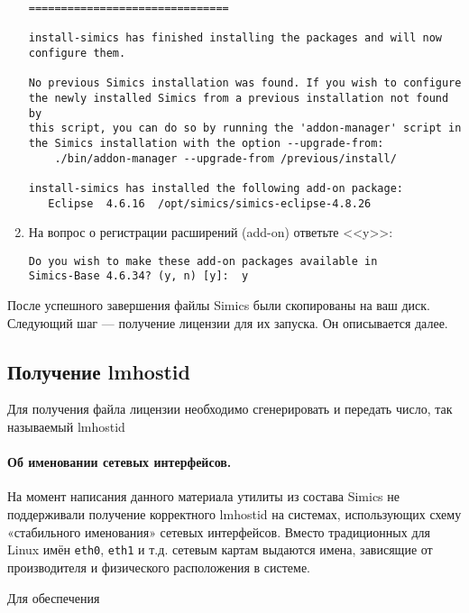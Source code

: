 \begin{enumerate}
\begin{lstlisting}
===============================

install-simics has finished installing the packages and will now
configure them.

No previous Simics installation was found. If you wish to configure
the newly installed Simics from a previous installation not found by
this script, you can do so by running the 'addon-manager' script in
the Simics installation with the option --upgrade-from:
    ./bin/addon-manager --upgrade-from /previous/install/

install-simics has installed the following add-on package:
   Eclipse  4.6.16  /opt/simics/simics-eclipse-4.8.26
\end{lstlisting}

\item На вопрос о регистрации расширений (\abbr add-on) ответьте <<y>>:
\begin{lstlisting}
Do you wish to make these add-on packages available in
Simics-Base 4.6.34? (y, n) [y]:  y
\end{lstlisting}   
\end{enumerate}

После успешного завершения файлы Simics были скопированы на ваш диск. Следующий шаг --- получение лицензии для их запуска. Он описывается далее.

\subsection{Получение lmhostid}

Для получения файла лицензии необходимо сгенерировать и передать число, так называемый lmhostid

\paragraph{Об именовании сетевых интерфейсов.} На момент написания данного материала утилиты из состава Simics не поддерживали получение корректного lmhostid на системах, использующих схему «стабильного именования» сетевых интерфейсов. Вместо традиционных для Linux имён \texttt{eth0}, \texttt{eth1} и т.д. сетевым картам выдаются имена, зависящие от производителя и физического расположения в системе.

Для обеспечения \todo

